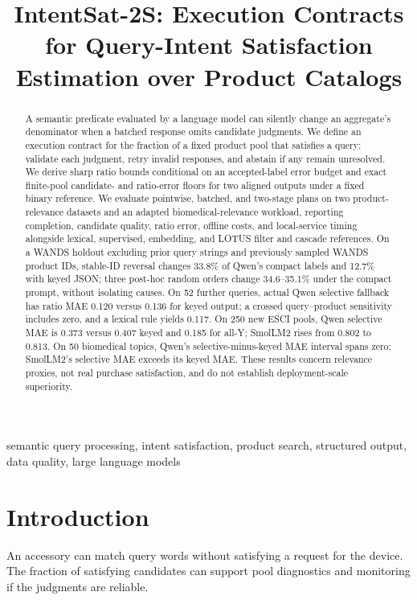 \documentclass[conference]{IEEEtran}
\begin{document}
\title{IntentSat-2S: Execution Contracts for Query-Intent Satisfaction Estimation over Product Catalogs}
\author{}
\maketitle
\begin{abstract}
A semantic predicate evaluated by a language model can silently change an aggregate's denominator when a batched response omits candidate judgments. We define an execution contract for the fraction of a fixed product pool that satisfies a query: validate each judgment, retry invalid responses, and abstain if any remain unresolved. We derive sharp ratio bounds conditional on an accepted-label error budget and exact finite-pool candidate- and ratio-error floors for two aligned outputs under a fixed binary reference. We evaluate pointwise, batched, and two-stage plans on two product-relevance datasets and an adapted biomedical-relevance workload, reporting completion, candidate quality, ratio error, offline costs, and local-service timing alongside lexical, supervised, embedding, and LOTUS filter and cascade references. On a WANDS holdout excluding prior query strings and previously sampled WANDS product IDs, stable-ID reversal changes 33.8\% of Qwen's compact labels and 12.7\% with keyed JSON; three post-hoc random orders change 34.6--35.1\% under the compact prompt, without isolating causes. On 52 further queries, actual Qwen selective fallback has ratio MAE 0.120 versus 0.136 for keyed output; a crossed query--product sensitivity includes zero, and a lexical rule yields 0.117. On 250 new ESCI pools, Qwen selective MAE is 0.373 versus 0.407 keyed and 0.185 for all-Y; SmolLM2 rises from 0.802 to 0.813. On 50 biomedical topics, Qwen's selective-minus-keyed MAE interval spans zero; SmolLM2's selective MAE exceeds its keyed MAE. These results concern relevance proxies, not real purchase satisfaction, and do not establish deployment-scale superiority.
\end{abstract}
\begin{IEEEkeywords}
semantic query processing, intent satisfaction, product search, structured output, data quality, large language models
\end{IEEEkeywords}

\section{Introduction}
An accessory can match query words without satisfying a request for the device. The fraction of satisfying candidates can support pool diagnostics and monitoring if the judgments are reliable.
\end{document}
